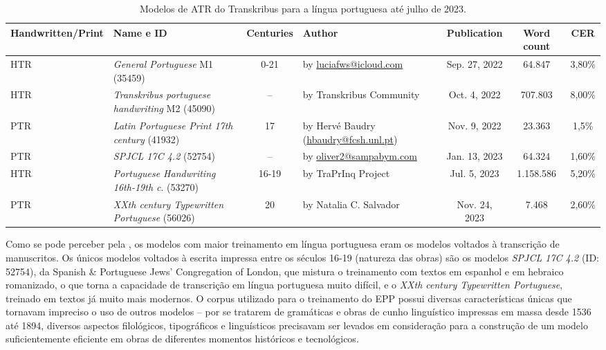\documentclass[portuguese]{textolivre}
\begin{document}
\begin{table}[h]
\centering
\caption{Modelos de ATR do Transkribus para a língua portuguesa até julho de 2023.}
\label{tab1}
\footnotesize
\setlength{\tabcolsep}{3pt} 

\begin{tabularx}{\textwidth}{@{} >{\raggedright\arraybackslash}p{1cm} >{\raggedright\arraybackslash}X c >{\raggedright\arraybackslash}p{3.5cm} c c c @{}}
\toprule
Hand\-written/\newline{}Print & Name e ID & Centuries & {Author} & Publication & Word count & {CER} \\ \midrule

HTR & \textit{General Portuguese} M1 (35459) & 0-21 & by \href{mailto:luciafws@icloud.com}{luciafws@icloud.com} & Sep. 27, 2022 & 64.847 & 3,80\% \\ \midrule

HTR & \textit{Transkribus portuguese handwriting} M2 (45090) & -- & by Transkribus Community & Oct. 4, 2022 & 707.803 & 8,00\% \\ \midrule

PTR & \textit{Latin Portuguese Print 17th century} (41932) & 17 & by Hervé Baudry (\href{mailto:hbaudry@fcsh.unl.pt}{hbaudry@fcsh.unl.pt}) & Nov. 9, 2022 & 23.363 & 1,5\% \\ \midrule

PTR & \textit{SPJCL 17C 4.2} (52754) & -- & by \href{mailto:oliver2@sampabym.com}{oliver2@sampabym.com} & Jan. 13, 2023 & 64.324 & 1,60\% \\ \midrule

HTR &\textit{ Portuguese Handwriting 16th-19th c}. (53270) & 16-19 & by TraPrInq Project & Jul. 5, 2023 & 1.158.586 & 5,20\% \\ \midrule

PTR & \textit{ XXth century Typewritten Portuguese }(56026) & 20 & by Natalia C. Salvador & Nov. 24, 2023 & 7.468 & 2,60\% \\ 
\bottomrule
\end{tabularx}
\end{table}

Como se pode perceber pela , os modelos com maior treinamento em língua portuguesa eram os modelos voltados à transcrição de manuscritos. Os únicos modelos voltados à escrita impressa entre os séculos 16-19 (natureza das obras) são os modelos \textit{SPJCL 17C 4.2} (ID: 52754), da Spanish \& Portuguese Jews’ Congregation of London, que mistura o treinamento com textos em espanhol e em hebraico romanizado, o que torna a capacidade de transcrição em língua portuguesa muito difícil, e o \textit{XXth century Typewritten Portuguese}, treinado em textos já muito mais modernos. O corpus utilizado para o treinamento do EPP possui diversas características únicas que tornavam impreciso o uso de outros modelos – por se tratarem de gramáticas e obras de cunho linguístico impressas em massa desde 1536 até 1894, diversos aspectos filológicos, tipográficos e linguísticos precisavam ser levados em consideração para a construção de um modelo suficientemente eficiente em obras de diferentes momentos históricos e tecnológicos.
\end{document}
